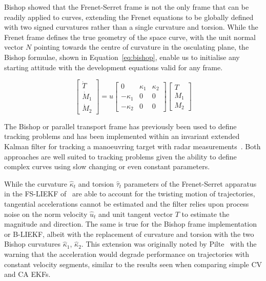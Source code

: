 \documentclass[11pt]{article}
\begin{document}
Bishop showed that the Frenet-Serret frame is not the only frame that can be readily applied to curves, extending the Frenet equations to be globally defined~\cite{bishop1975more} with two signed curvatures rather than a single curvature and torsion. While the Frenet frame defines the true geometry of the space curve, with the unit normal vector $N$ pointing towards the centre of curvature in the osculating plane, the Bishop formulae, shown in Equation~\eqref{eq:bishop}, enable us to initialise any starting attitude with the development equations valid for any frame.

\begin{equation}
\begin{bmatrix}
\dot{T} \\
\dot{M}_1 \\
\dot{M}_2
\end{bmatrix}
= u
\begin{bmatrix}
0 & \kappa_1 & \kappa_2 \\
-\kappa_1 & 0 & 0 \\
-\kappa_2 & 0 & 0
\end{bmatrix}
\begin{bmatrix}
T \\
M_1 \\
M_2
\end{bmatrix}
\label{eq:bishop}
\end{equation}

The Bishop or parallel transport frame has previously been used to define tracking problems and has been implemented within an invariant extended Kalman filter for tracking a manoeuvring target with radar measurements~\cite{gibbs2022invariant}. Both approaches are well suited to tracking problems given the ability to define complex curves using slow changing or even constant parameters.

While the curvature $\hat{\kappa}_t$ and torsion $\hat{\tau}_t$ parameters of the Frenet-Serret apparatus in the FS-LIEKF of~\cite{pilte2017tracking} are able to account for the twisting motion of trajectories, tangential accelerations cannot be estimated and the filter relies upon process noise on the norm velocity $\hat{u}_t$ and unit tangent vector $T$ to estimate the magnitude and direction. The same is true for the Bishop frame implementation or B-LIEKF, albeit with the replacement of curvature and torsion with the two Bishop curvatures $\hat{\kappa}_1$, $\hat{\kappa}_2$. This extension was originally noted by Pilte~\cite{piltePhD} with the warning that the acceleration would degrade performance on trajectories with constant velocity segments, similar to the results seen when comparing simple CV and CA EKFs.
\end{document}
